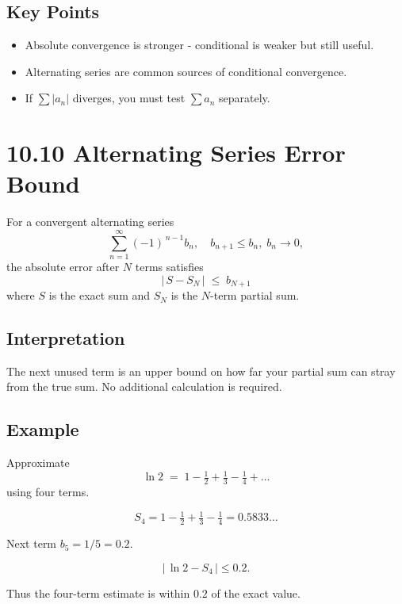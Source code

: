 \documentclass{article}
\begin{document}
\subsection*{Key Points}
\begin{itemize}[itemsep=4pt]
  \item Absolute convergence is stronger - conditional is weaker but still useful.
  \item Alternating series are common sources of conditional convergence.
  \item If \(\sum |a_n|\) diverges, you must test \(\sum a_n\) separately.
\end{itemize}

\newpage
\section{10.10 Alternating Series Error Bound}

\begin{tcolorbox}[colback=gray!8,colframe=black,title=Error Bound (Leibniz)]
For a convergent alternating series  
\[
\sum_{n=1}^{\infty}(-1)^{\,n-1} b_n,
\quad b_{n+1}\le b_n,\; b_n\to 0,
\]
the absolute error after \(N\) terms satisfies
\[
\boxed{\;|\,S - S_N\,| \;\le\; b_{N+1}\;}
\]
where
\(S\) is the exact sum and \(S_N\) is the \(N\)-term partial sum.
\end{tcolorbox}

\subsection*{Interpretation}
The next unused term is an upper bound on how far your partial sum
can stray from the true sum.  
No additional calculation is required.

\subsection*{Example}

Approximate
\[
\ln 2
\;=\;
1 - \tfrac12 + \tfrac13 - \tfrac14 + \dots
\]
using four terms.

\[
S_4 = 1 - \tfrac12 + \tfrac13 - \tfrac14 = 0.5833\ldots
\]

Next term \(b_{5}=1/5=0.2\).

\[
|\,\ln 2 - S_4\,| \le 0.2.
\]

Thus the four-term estimate is within \(0.2\) of the exact value.
\end{document}
